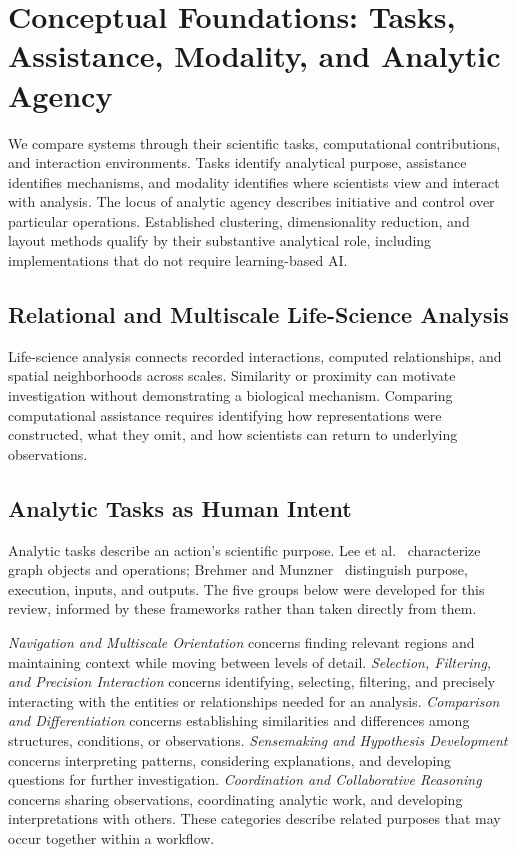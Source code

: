 \section{Conceptual Foundations: Tasks, Assistance, Modality, and Analytic Agency}
\label{sec:foundations}

We compare systems through their scientific tasks, computational contributions, and interaction environments. Tasks identify analytical purpose, assistance identifies mechanisms, and modality identifies where scientists view and interact with analysis. The locus of analytic agency describes initiative and control over particular operations. Established clustering, dimensionality reduction, and layout methods qualify by their substantive analytical role, including implementations that do not require learning-based AI.

\subsection{Relational and Multiscale Life-Science Analysis}
\label{subsection:relationalanalysis}

Life-science analysis connects recorded interactions, computed relationships, and spatial neighborhoods across scales. Similarity or proximity can motivate investigation without demonstrating a biological mechanism. Comparing computational assistance requires identifying how representations were constructed, what they omit, and how scientists can return to underlying observations.

\subsection{Analytic Tasks as Human Intent}
\label{subsection:taskintent}

Analytic tasks describe an action's scientific purpose. Lee et al.~\cite{Lee2006TaskTaxonomy} characterize graph objects and operations; Brehmer and Munzner~\cite{Brehmer2013WhyHowWhat} distinguish purpose, execution, inputs, and outputs. The five groups below were developed for this review, informed by these frameworks rather than taken directly from them.

\emph{Navigation and Multiscale Orientation} concerns finding relevant regions and maintaining context while moving between levels of detail. \emph{Selection, Filtering, and Precision Interaction} concerns identifying, selecting, filtering, and precisely interacting with the entities or relationships needed for an analysis. \emph{Comparison and Differentiation} concerns establishing similarities and differences among structures, conditions, or observations. \emph{Sensemaking and Hypothesis Development} concerns interpreting patterns, considering explanations, and developing questions for further investigation. \emph{Coordination and Collaborative Reasoning} concerns sharing observations, coordinating analytic work, and developing interpretations with others. These categories describe related purposes that may occur together within a workflow.

